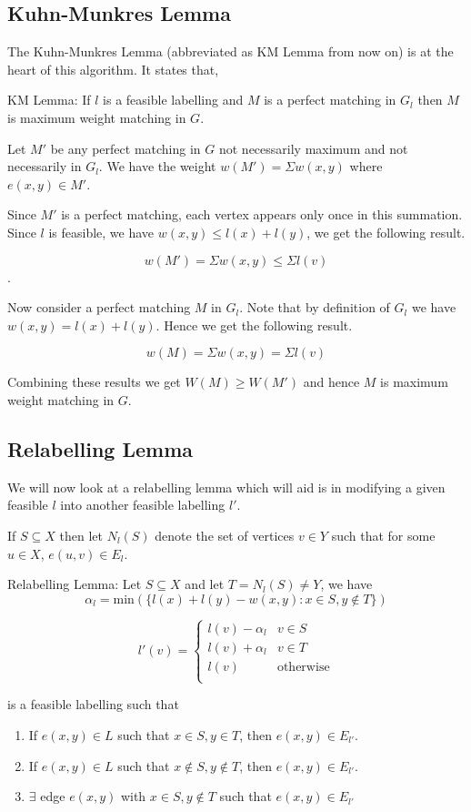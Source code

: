 \subsection{Kuhn-Munkres Lemma}
The Kuhn-Munkres Lemma (abbreviated as KM Lemma from now on) is at the heart of this algorithm. It states that,

KM Lemma: If $l$ is a feasible labelling and $M$ is a perfect matching in $G_l$ then $M$ is maximum weight matching in $G$.

Let $M'$ be any perfect matching in $G$ not necessarily maximum and not necessarily in $G_l$. We have the weight $w(M') = \Sigma w(x, y)$ where $e(x, y) \in M'$.

Since $M'$ is a perfect matching, each vertex appears only once in this summation. Since $l$ is feasible, we have $w(x, y) \leq l(x)+l(y)$, we get the following result.

$$w(M') = \Sigma w(x, y) \leq \Sigma l(v)$$.

Now consider a perfect matching $M$ in $G_l$. Note that by definition of $G_l$ we have $w(x, y) = l(x)+l(y)$. Hence we get the following result.

$$w(M) = \Sigma w(x, y) = \Sigma l(v)$$

Combining these results we get $W(M) \geq W(M')$ and hence $M$ is maximum weight matching in $G$.

\subsection{Relabelling Lemma}
We will now look at a relabelling lemma which will aid is in modifying a given feasible $l$ into another feasible labelling $l'$.

If $S \subseteq X$ then let $N_l(S)$ denote the set of vertices $v \in Y$ such that for some $u \in X$, $e(u, v) \in E_l$.

Relabelling Lemma: Let $S \subseteq X$ and let $T=N_l(S) \neq Y$, we have $$\alpha_l = \mathrm{min}(\{l(x)+l(y)-w(x, y) : x \in S, y \notin T\})$$

$$l'(v) = 
\begin{cases}
l(v)-\alpha_l & v \in S \\
l(v)+\alpha_l & v \in T \\
l(v) & \mathrm{otherwise} \\
\end{cases} $$ 

is a feasible labelling such that
\begin{enumerate}
    \item If $e(x, y) \in L$ such that $x \in S, y \in T$, then $e(x, y) \in E_{l'}$.
    \item If $e(x, y) \in L$ such that $x \notin S, y \notin T$, then $e(x, y) \in E_{l'}$.
    \item $\exists$ edge $e(x, y)$ with $x \in S, y \notin T$ such that $e(x, y) \in E_{l'}$ 
\end{enumerate}

